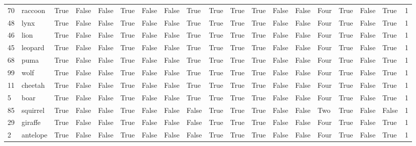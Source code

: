 \begin{tabular}{llllllllllllllllllr}
70  &     raccoon &   True &     False &  False &   True &     False &    False &      True &     True &      True &      True &     False &  False &   Four &   True &     False &     True &           1 \\
48  &        lynx &   True &     False &  False &   True &     False &    False &      True &     True &      True &      True &     False &  False &   Four &   True &     False &     True &           1 \\
46  &        lion &   True &     False &  False &   True &     False &    False &      True &     True &      True &      True &     False &  False &   Four &   True &     False &     True &           1 \\
45  &     leopard &   True &     False &  False &   True &     False &    False &      True &     True &      True &      True &     False &  False &   Four &   True &     False &     True &           1 \\
68  &        puma &   True &     False &  False &   True &     False &    False &      True &     True &      True &      True &     False &  False &   Four &   True &     False &     True &           1 \\
99  &        wolf &   True &     False &  False &   True &     False &    False &      True &     True &      True &      True &     False &  False &   Four &   True &     False &     True &           1 \\
11  &     cheetah &   True &     False &  False &   True &     False &    False &      True &     True &      True &      True &     False &  False &   Four &   True &     False &     True &           1 \\
5   &        boar &   True &     False &  False &   True &     False &    False &      True &     True &      True &      True &     False &  False &   Four &   True &     False &     True &           1 \\
85  &    squirrel &   True &     False &  False &   True &     False &    False &     False &     True &      True &      True &     False &  False &    Two &   True &     False &    False &           1 \\
29  &     giraffe &   True &     False &  False &   True &     False &    False &     False &     True &      True &      True &     False &  False &   Four &   True &     False &     True &           1 \\
2   &    antelope &   True &     False &  False &   True &     False &    False &     False &     True &      True &      True &     False &  False &   Four &   True &     False &     True &           1 \\

\end{tabular}

